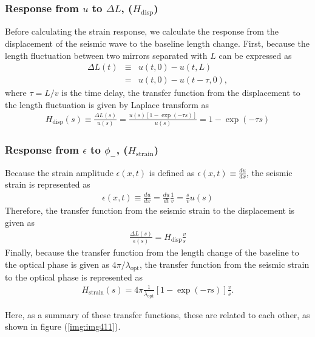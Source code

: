 \subsubsection{Response from $u$ to $\Delta{L}$, ($H_{\mathrm{disp}}$)}
Before calculating the strain response, we calculate the response from the displacement of the seismic wave to the baseline length change. First, because the length fluctuation between two mirrors separated with $L$ can be expressed as 
\begin{eqnarray} 
  \Delta{L(t)} &\equiv& u(t,0) - u(t,L) \\
  &=& u(t,0) - u(t-\tau,0), \label{eq:eq403}
\end{eqnarray}
where $\tau=L/v$ is the time delay, the transfer function from the displacement to the length fluctuation is given by Laplace transform as
\begin{eqnarray} \label{eq:eq404}
  H_{\mathrm{disp}}(s) \equiv \frac{\Delta{L(s)}}{u(s)} = \frac{u(s)\left[ 1-\exp(-\tau{s}) \right]}{u(s)} = 1 - \exp(-\tau{s})
\end{eqnarray}

\subsubsection{Response from $\epsilon$ to $\phi_{-}$, ($H_{\mathrm{strain}}$)}
Because the strain amplitude $\epsilon{(x,t)}$ is defined as $\epsilon{(x,t)}\equiv\frac{du}{dx}$, the seismic strain is represented as 
\begin{eqnarray} 
  \epsilon{(x,t)} \equiv \frac{du}{dx} = \frac{du}{dt} \frac{1}{v} = \frac{s}{v}u(s) \label{eq:eq406}
\end{eqnarray}
Therefore, the transfer function from the seismic strain to the displacement is given  as
\begin{eqnarray} \label{eq:eq407}
  \frac{\Delta{L(s)}}{\epsilon(s)} = H_{\mathrm{disp}} \frac{v}{s}
\end{eqnarray}
Finally, because the transfer function from the length change of the baseline to the optical phase is given as $4\pi/{\lambda_{\mathrm{opt}}}$, the transfer function from the seismic strain to the optical phase is represented as 
\begin{eqnarray} \label{eq:eq407}
  H_{\mathrm{strain}}(s) = 4\pi\frac{1}{\lambda_{\mathrm{opt}}} \left[1 - \exp(-\tau{s}) \right]\frac{v}{s}.
\end{eqnarray}

Here, as a summary of these transfer functions, these are related to each other, as shown in figure (\ref{img:img411}). 


